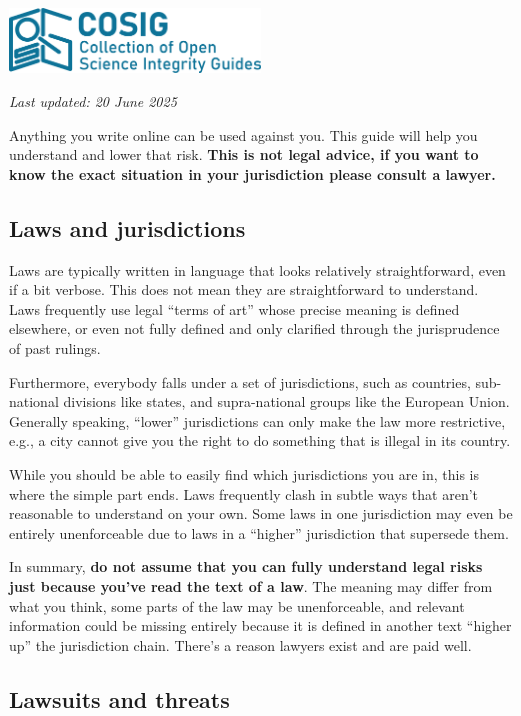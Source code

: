 \documentclass[letterpaper, 12pt]{article}
\begin{document}
\flushleft\includegraphics[width=0.5\textwidth]{img/home/241017_final_logo_mockup.png}

\textit{Last updated: 20 June 2025}

Anything you write online can be used against you.
This guide will help you understand and lower that risk.
\textbf{This is not legal advice, if you want to know the exact situation in your jurisdiction please consult a lawyer.}

\subsection*{Laws and jurisdictions}

Laws are typically written in language that looks relatively straightforward, even if a bit verbose. This does not mean they are straightforward to understand. Laws frequently use legal ``terms of art'' whose precise meaning is defined elsewhere, or even not fully defined and only clarified through the jurisprudence of past rulings.

Furthermore, everybody falls under a set of jurisdictions, such as countries, sub-national divisions like states, and supra-national groups like the European Union. Generally speaking, ``lower'' jurisdictions can only make the law more restrictive, e.g., a city cannot give you the right to do something that is illegal in its country.

While you should be able to easily find which jurisdictions you are in, this is where the simple part ends.
Laws frequently clash in subtle ways that aren't reasonable to understand on your own.
Some laws in one jurisdiction may even be entirely unenforceable due to laws in a ``higher'' jurisdiction that supersede them.

In summary, \textbf{do not assume that you can fully understand legal risks just because you've read the text of a law}.
The meaning may differ from what you think, some parts of the law may be unenforceable, and relevant information could be missing entirely because it is defined in another text ``higher up'' the jurisdiction chain. There's a reason lawyers exist and are paid well.

\subsection*{Lawsuits and threats}
\end{document}
